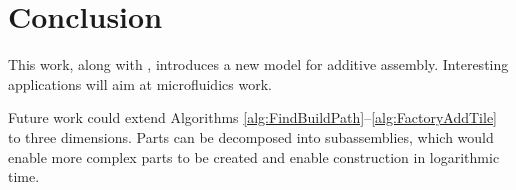 
\section{Conclusion}\label{sec:Conclusion}

This work, along with \cite{Becker2013f,Becker2014,Becker2014a}, introduces a
new model for additive assembly.  Interesting applications will aim at  microfluidics work.

Future work could extend Algorithms \ref{alg:FindBuildPath}--\ref{alg:FactoryAddTile} to three dimensions. 
Parts can be decomposed into subassemblies, which would enable more complex parts to be created and enable construction in logarithmic time.
    